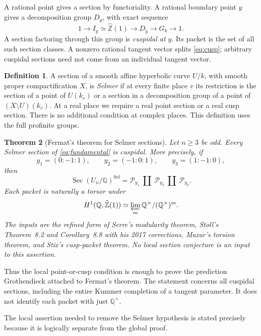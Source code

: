 \documentclass[11pt,a4paper]{article}
\newcommand{\Q}{\mathbb Q}
\newcommand{\Z}{\mathbb Z}
\newcommand{\Zhat}{\widehat{\Z}}
\newcommand{\Sel}{\mathrm{Sel}}
\DeclareMathOperator{\Sec}{Sec}
\theoremstyle{plain}
\newtheorem{theorem}{Theorem}[section]
\theoremstyle{definition}
\newtheorem{definition}[theorem]{Definition}
\begin{document}
A rational point gives a section by functoriality. A rational boundary point
$y$ gives a decomposition group $D_{\widetilde y}$, with exact sequence
\begin{equation}\label{eq:cusp}
 1\longrightarrow I_{\widetilde y}\simeq\Zhat(1)
 \longrightarrow D_{\widetilde y}\longrightarrow G_k\longrightarrow1.
\end{equation}
A section factoring through this group is \emph{cuspidal at $y$}. Its packet
is the set of all such section classes. A nonzero rational tangent vector
splits \eqref{eq:cusp}; arbitrary cuspidal sections need not come from an
individual tangent vector.

\begin{definition}\label{def:selmer}
A section of a smooth affine hyperbolic curve $U/k$, with smooth proper
compactification $X$, is \emph{Selmer} if at every finite place $v$ its
restriction is the section of a point of $U(k_v)$ or a section in a
decomposition group of a point of $(X\setminus U)(k_v)$. At a real place we
require a real point section or a real cusp section. There is no additional
condition at complex places. This definition uses the full profinite groups.
\end{definition}

\begin{theorem}[Fermat's theorem for Selmer sections]\label{thm:fermat}
Let $n\geq3$ be odd. Every Selmer section of \eqref{eq:fundamental} is
cuspidal. More precisely, if
\[
 y_1=(0:-1:1),\qquad y_2=(-1:0:1),\qquad y_3=(1:-1:0),
\]
then
\begin{equation}\label{eq:packets}
 \Sec(U_n/\Q)^{\Sel}=\mathcal P_{y_1}\ \coprod\
 \mathcal P_{y_2}\ \coprod\ \mathcal P_{y_3}.
\end{equation}
Each packet is naturally a torsor under
\[
 H^1(\Q,\Zhat(1))\simeq\varprojlim_m\Q^\times/(\Q^\times)^m.
\]
The inputs are the refined form of Serre's modularity theorem,
Stoll's Theorem~8.2 and Corollary~8.8 with his 2017 corrections,
Mazur's torsion theorem, and Stix's cusp-packet theorem. No local section
conjecture is an input to this assertion.
\end{theorem}

Thus the local point-or-cusp condition is enough to prove the prediction
Grothendieck attached to Fermat's theorem. The statement concerns all
cuspidal sections, including the entire Kummer completion of a tangent
parameter. It does not identify each packet with just $\Q^\times$.

The local assertion needed to remove the Selmer hypothesis is stated precisely
because it is logically separate from the global proof.
\end{document}
